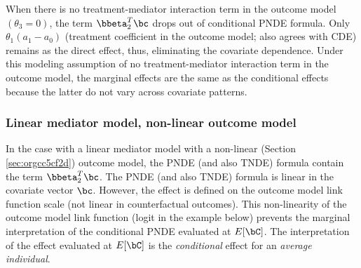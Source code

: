 \documentclass[10pt]{article}
\begin{document}
When there is no treatment-mediator interaction term in the outcome model \((\theta_{3} = 0)\), the term \(\bbeta_{2}^{T}\bc\) drops out of conditional PNDE formula. Only \(\theta_{1}(a_{1} - a_{0})\) (treatment coefficient in the outcome model; also agrees with CDE) remains as the direct effect, thus, eliminating the covariate dependence. Under this modeling assumption of no treatment-mediator interaction term in the outcome model, the marginal effects are the same as the conditional effects because the latter do not vary across covariate patterns.

\subsubsection{Linear mediator model, non-linear outcome model}
\label{sec:orgeb6ced8}
In the case with a linear mediator model with a non-linear (Section \ref{sec:orgcc5cf2d}) outcome model, the PNDE (and also TNDE) formula contain the term \(\bbeta_{2}^{T}\bc\). The PNDE (and also TNDE) formula is linear in the covariate vector \(\bc\). However, the effect is defined on the outcome model link function scale (not linear in counterfactual outcomes). This non-linearity of the outcome model link function (logit in the example below) prevents the marginal interpretation of the conditional PNDE evaluated at \(E[\bC]\). The interpretation of the effect evaluated at \(E[\bC]\) is the \emph{conditional} effect for an \emph{average individual}.
\end{document}
